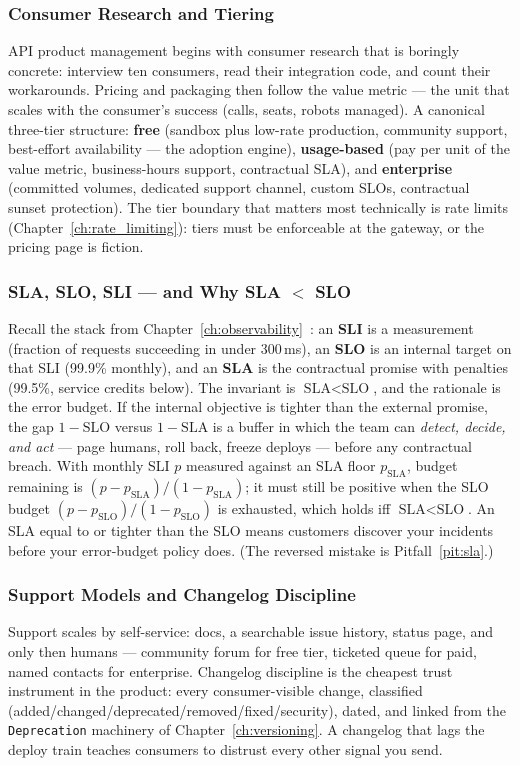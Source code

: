 \subsubsection{Consumer Research and Tiering}
API product management begins with consumer research that is boringly
concrete: interview ten consumers, read their integration code, and
count their workarounds. Pricing and packaging then follow the value
metric --- the unit that scales with the consumer's success (calls, seats,
robots managed). A canonical three-tier structure: \textbf{free} (sandbox
plus low-rate production, community support, best-effort availability ---
the adoption engine), \textbf{usage-based} (pay per unit of the value
metric, business-hours support, contractual SLA), and \textbf{enterprise}
(committed volumes, dedicated support channel, custom SLOs, contractual
sunset protection). The tier boundary that matters most technically is
rate limits (Chapter~\ref{ch:rate_limiting}): tiers must be enforceable
at the gateway, or the pricing page is fiction.

\subsubsection{SLA, SLO, SLI --- and Why SLA $<$ SLO}
Recall the stack from Chapter~\ref{ch:observability}~\cite{beyer2016sre}:
an \textbf{SLI} is a measurement (fraction of requests succeeding in
under 300\,ms), an \textbf{SLO} is an internal target on that SLI
(99.9\% monthly), and an \textbf{SLA} is the contractual promise with
penalties (99.5\%, service credits below). The invariant is
$\text{SLA} < \text{SLO}$, and the rationale is the error budget. If the
internal objective is tighter than the external promise, the gap
$1 - \text{SLO}$ versus $1 - \text{SLA}$ is a buffer in which the team can
\emph{detect, decide, and act} --- page humans, roll back, freeze deploys
--- before any contractual breach. With monthly SLI $p$ measured against
an SLA floor $p_{\text{SLA}}$, budget remaining is
$(p - p_{\text{SLA}})/(1 - p_{\text{SLA}})$; it must still be positive
when the SLO budget $(p - p_{\text{SLO}})/(1 - p_{\text{SLO}})$ is
exhausted, which holds iff $\text{SLA} < \text{SLO}$. An SLA equal to or
tighter than the SLO means customers discover your incidents before your
error-budget policy does. (The reversed mistake is
Pitfall~\ref{pit:sla}.)

\subsubsection{Support Models and Changelog Discipline}
Support scales by self-service: docs, a searchable issue history, status
page, and only then humans --- community forum for free tier, ticketed
queue for paid, named contacts for enterprise. Changelog discipline is the
cheapest trust instrument in the product: every consumer-visible change,
classified (added/changed/deprecated/removed/fixed/security), dated, and
linked from the \texttt{Deprecation} machinery of
Chapter~\ref{ch:versioning}. A changelog that lags the deploy train
teaches consumers to distrust every other signal you send.

